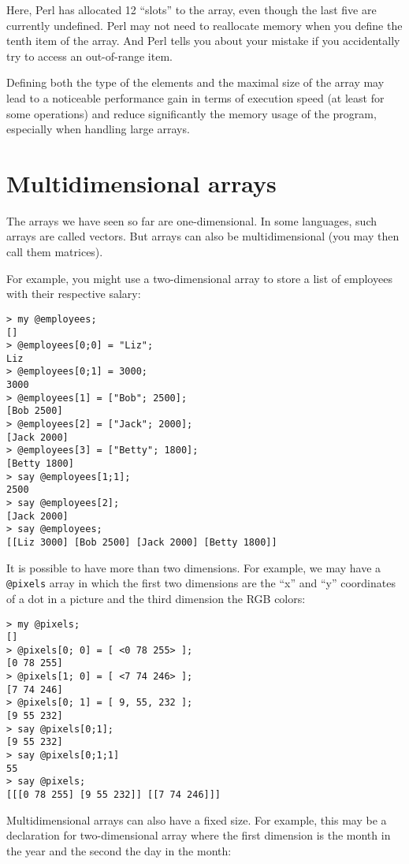 Here, Perl has allocated 12 ``slots'' to the array, even though 
the last five are currently undefined. Perl may not need 
to reallocate memory when you define the tenth item of 
the array. And Perl tells you about your mistake if you 
accidentally try to access an out-of-range item.

Defining both the type of the elements and the maximal size 
of the array may lead to a noticeable performance gain 
in terms of execution speed (at least for some operations) 
and reduce significantly the memory usage of the program, 
especially when handling large arrays.

\section{Multidimensional arrays}
\label{multidimensional array}
\label{multidimensional_array}

The arrays we have seen so far are one-dimensional. In some 
languages, such arrays are called vectors. But arrays can 
also be multidimensional (you may then call them matrices).

For example, you might use a two-dimensional array to 
store a list of employees with their respective salary:

\begin{verbatim}
> my @employees;
[]
> @employees[0;0] = "Liz";
Liz
> @employees[0;1] = 3000;
3000
> @employees[1] = ["Bob"; 2500];
[Bob 2500]
> @employees[2] = ["Jack"; 2000];
[Jack 2000]
> @employees[3] = ["Betty"; 1800];
[Betty 1800]
> say @employees[1;1];
2500
> say @employees[2];
[Jack 2000]
> say @employees;
[[Liz 3000] [Bob 2500] [Jack 2000] [Betty 1800]]
\end{verbatim}

It is possible to have more than two dimensions. For example, 
we may have a \verb'@pixels' array in which the first two 
dimensions are the ``x'' and ``y'' coordinates of a dot in
a picture and the third dimension the RGB colors:

\begin{verbatim}
> my @pixels;
[]
> @pixels[0; 0] = [ <0 78 255> ];
[0 78 255]
> @pixels[1; 0] = [ <7 74 246> ];
[7 74 246]
> @pixels[0; 1] = [ 9, 55, 232 ];
[9 55 232]
> say @pixels[0;1];
[9 55 232]
> say @pixels[0;1;1]
55
> say @pixels;
[[[0 78 255] [9 55 232]] [[7 74 246]]]
\end{verbatim} 

Multidimensional arrays can also have a fixed size. For 
example, this may be a declaration for two-dimensional array 
where the first dimension is the month in the year and 
the second the day in the month:

